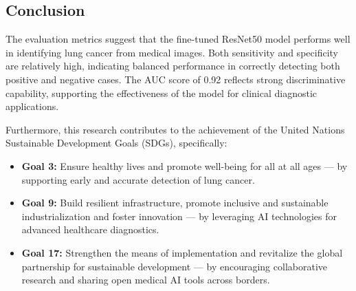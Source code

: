 
\subsection{Conclusion}

The evaluation metrics suggest that the fine-tuned ResNet50 model performs well in identifying lung 
cancer from medical images. Both sensitivity and specificity are relatively high, indicating 
balanced performance in correctly detecting both positive and negative cases. The AUC score of 0.92 
reflects strong discriminative capability, supporting the effectiveness of the model for clinical 
diagnostic applications.

Furthermore, this research contributes to the achievement of the United Nations Sustainable Development Goals (SDGs), specifically:

\begin{itemize}
    \item \textbf{Goal 3:} Ensure healthy lives and promote well-being for all at all ages — by supporting early and accurate detection of lung cancer.
    \item \textbf{Goal 9:} Build resilient infrastructure, promote inclusive and sustainable industrialization and foster innovation — by leveraging AI technologies for advanced healthcare diagnostics.
    \item \textbf{Goal 17:} Strengthen the means of implementation and revitalize the global partnership for sustainable development — by encouraging collaborative research and sharing open medical AI tools across borders.
\end{itemize}
